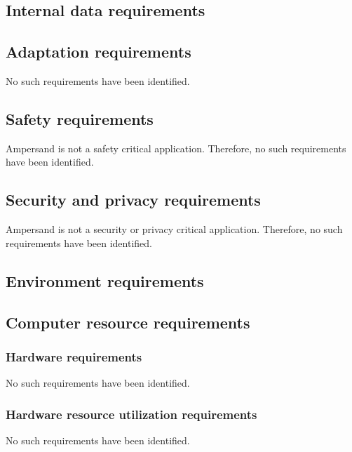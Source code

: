 \subsection{Internal data requirements}

\subsection{Adaptation requirements}
No such requirements have been identified.

\subsection{Safety requirements}
Ampersand is not a safety critical application.
Therefore, no such requirements have been identified.

\subsection{Security and privacy requirements}
Ampersand is not a security or privacy critical application.
Therefore, no such requirements have been identified.

\subsection{Environment requirements}

\subsection{Computer resource requirements}
	\subsubsection{Hardware requirements}
	No such requirements have been identified.

	\subsubsection{Hardware resource utilization requirements}
	No such requirements have been identified.

